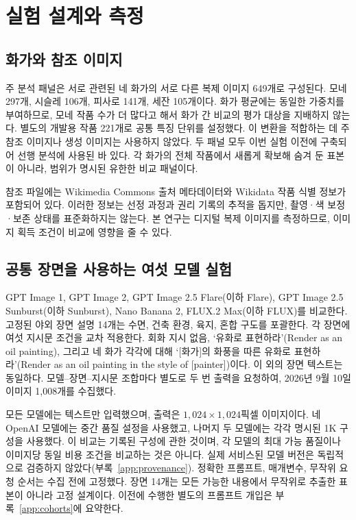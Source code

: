 \documentclass[11pt,a4paper]{article}
\begin{document}
\section{실험 설계와 측정}\label{sec:design}
\subsection{화가와 참조 이미지}
주 분석 패널은 서로 관련된 네 화가의 서로 다른 복제 이미지 649개로 구성된다. 모네 297개, 시슬레 106개, 피사로 141개, 세잔 105개이다. 화가 평균에는 동일한 가중치를 부여하므로, 모네 작품 수가 더 많다고 해서 화가 간 비교의 평가 대상을 지배하지 않는다. 별도의 개발용 작품 221개로 공통 특징 단위를 설정했다. 이 변환을 적합하는 데 주 참조 이미지나 생성 이미지는 사용하지 않았다. 두 패널 모두 이번 실험 이전에 구축되어 선행 분석에 사용된 바 있다. 각 화가의 전체 작품에서 새롭게 확보해 숨겨 둔 표본이 아니라, 범위가 명시된 유한한 비교 패널이다.

참조 파일에는 Wikimedia Commons 출처 메타데이터와 Wikidata 작품 식별 정보가 포함되어 있다\citep{commonsglam,vrandecic2014wikidata}. 이러한 정보는 선정 과정과 권리 기록의 추적을 돕지만, 촬영·색 보정·보존 상태를 표준화하지는 않는다. 본 연구는 디지털 복제 이미지를 측정하므로, 이미지 획득 조건이 비교에 영향을 줄 수 있다.

\subsection{공통 장면을 사용하는 여섯 모델 실험}
GPT Image 1, GPT Image 2, GPT Image 2.5 Flare(이하 Flare), GPT Image 2.5 Sunburst(이하 Sunburst), Nano Banana 2, FLUX.2 Max(이하 FLUX)를 비교한다. 고정된 야외 장면 설명 14개는 수면, 건축 환경, 육지, 혼합 구도를 포괄한다. 각 장면에 여섯 지시문 조건을 교차 적용한다. 회화 지시 없음, ‘유화로 표현하라’(Render as an oil painting), 그리고 네 화가 각각에 대해 ‘[화가]의 화풍을 따른 유화로 표현하라’(Render as an oil painting in the style of [painter])이다. 이 외의 장면 텍스트는 동일하다. 모델--장면--지시문 조합마다 별도로 두 번 출력을 요청하여, 2026년 9월 10일 이미지 1,008개를 수집했다.

모든 모델에는 텍스트만 입력했으며, 출력은 $1{,}024\times1{,}024$픽셀 이미지이다. 네 OpenAI 모델에는 중간 품질 설정을 사용했고, 나머지 두 모델에는 각각 명시된 1K 구성을 사용했다. 이 비교는 기록된 구성에 관한 것이며, 각 모델의 최대 가능 품질이나 이미지당 동일 비용 조건을 비교하는 것은 아니다. 실제 서비스된 모델 버전은 독립적으로 검증하지 않았다(부록~\ref{app:provenance}). 정확한 프롬프트, 매개변수, 무작위 요청 순서는 수집 전에 고정했다. 장면 14개는 모든 가능한 내용에서 무작위로 추출한 표본이 아니라 고정 설계이다. 이전에 수행한 별도의 프롬프트 개입은 부록~\ref{app:cohorts}에 요약한다.
\end{document}
